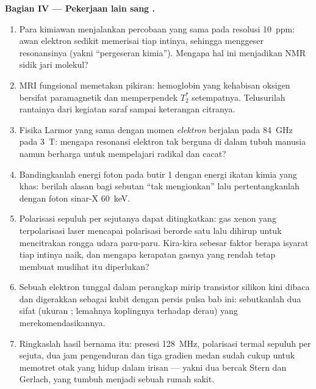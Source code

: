 \begin{problem}
\medskip\noindent\textbf{Bagian IV --- Pekerjaan lain sang .}
\begin{enumerate}[resume]
  \item Para kimiawan menjalankan percobaan yang sama pada resolusi
        \qty{10}{ppm}: awan elektron sedikit memerisai tiap intinya,
        sehingga menggeser resonansinya (yakni ``pergeseran kimia'').
        Mengapa hal ini menjadikan NMR sidik jari molekul?
  \item MRI fungsional memetakan pikiran: hemoglobin yang kehabisan
        oksigen bersifat paramagnetik dan memperpendek $T_2^*$
        setempatnya. Telusurilah rantainya dari kegiatan saraf sampai
        keterangan citranya.
  \item Fisika Larmor yang sama dengan momen \emph{elektron} berjalan
        pada \qty{84}{GHz} pada \qty{3}{T}: mengapa resonansi elektron
        tak berguna di dalam tubuh manusia namun berharga untuk
        mempelajari radikal dan cacat?
  \item Bandingkanlah energi foton pada butir 1 dengan energi ikatan
        kimia yang khas: berilah alasan bagi sebutan ``tak mengionkan''
        lalu pertentangkanlah dengan foton sinar-X \qty{60}{keV}.
  \item Polarisasi sepuluh per sejutanya dapat ditingkatkan: gas xenon
        yang terpolarisasi laser mencapai polarisasi berorde satu lalu
        dihirup untuk mencitrakan rongga udara paru-paru. Kira-kira
        sebesar faktor berapa isyarat tiap intinya naik, dan mengapa
        kerapatan gasnya yang rendah tetap membuat muslihat itu
        diperlukan?
  \item Sebuah  elektron tunggal dalam perangkap mirip transistor
        silikon kini dibaca dan digerakkan sebagai kubit dengan persis
        pulsa bab ini: sebutkanlah dua sifat  (ukuran ; lemahnya koplingnya terhadap derau) yang
        merekomendasikannya.
  \item Ringkaslah hasil bernama itu: presesi  \qty{128}{MHz},
        polarisasi termal sepuluh per sejuta, dua jam pengenduran dan
        tiga gradien medan sudah cukup untuk memotret otak yang hidup
        dalam irisan --- yakni dua bercak Stern dan Gerlach, yang tumbuh
        menjadi sebuah rumah sakit.
\end{enumerate}
\end{problem}
